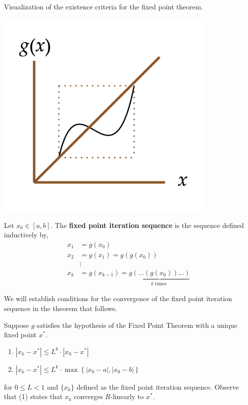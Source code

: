 \begin{marginfigure}
Visualization of the existence criteria for the fixed point theorem.
\begin{center}
       \includegraphics[width=0.8\textwidth]{figures/fig-2.png}
\end{center}
\end{marginfigure}

\begin{defn}
    Let $x_0 \in [a, b]$. The \textbf{fixed point iteration sequence} is the sequence defined inductively by,
    \begin{align*}
    x_1 &=g\left(x_0\right) \\
    x_2 &=g\left(x_1\right)=g\left(g\left(x_0\right)\right) \\
    & \vdots \\
    x_k &=g(x_{k-1}) = \underbrace{g\left(\ldots\left(g\left(x_0\right)\right) \ldots\right)}_{k \text { times }}
    \end{align*}
\end{defn}

\noindent We will establish conditions for the convergence of the fixed point iteration sequence in the theorem that follows.

\begin{thm}
    Suppose $g$ satisfies the hypothesis of the Fixed Point Theorem with a unique fixed point $x^*$.
    \begin{enumerate}
        \item $\left|x_k-x^*\right| \leq L^k \cdot \left|x_0-x^*\right|$
        \item $\left|x_k-x^*\right| \leq L^k \cdot \max \left\{\left|x_0-a\right|,\left|x_0-b\right|\right\}$
    \end{enumerate}
    for $0 \leq L < 1$ and $\{x_k\}$ defined as the fixed point iteration sequence. Observe that (1) states that $x_k$ converges $R$-linearly to $x^*$.
\end{thm}

